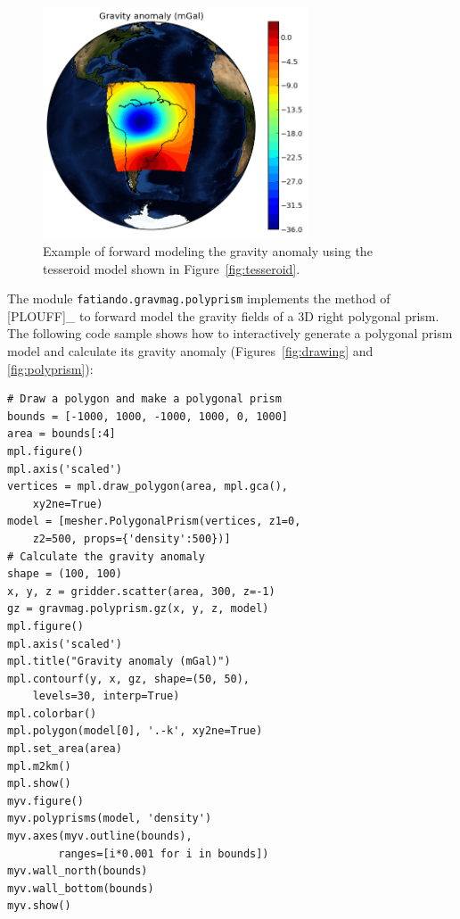 \begin{figure}
    \centering
    \includegraphics[width=0.7\textwidth]{figures/paper1/gravmag_tesseroid_data}
    \caption{
        Example of forward modeling the gravity anomaly using the tesseroid
        model shown in Figure~\ref{fig:tesseroid}.
    }
    \label{fig:tesseroidgrav}
\end{figure}

The module \texttt{fatiando.gravmag.polyprism} implements the method of
{[}PLOUFF{]}\_ to forward model the gravity fields of a 3D right
polygonal prism. The following code sample shows how to interactively
generate a polygonal prism model and calculate its gravity anomaly
(Figures~\ref{fig:drawing} and \ref{fig:polyprism}):

\begin{verbatim}
# Draw a polygon and make a polygonal prism
bounds = [-1000, 1000, -1000, 1000, 0, 1000]
area = bounds[:4]
mpl.figure()
mpl.axis('scaled')
vertices = mpl.draw_polygon(area, mpl.gca(),
    xy2ne=True)
model = [mesher.PolygonalPrism(vertices, z1=0,
    z2=500, props={'density':500})]
# Calculate the gravity anomaly
shape = (100, 100)
x, y, z = gridder.scatter(area, 300, z=-1)
gz = gravmag.polyprism.gz(x, y, z, model)
mpl.figure()
mpl.axis('scaled')
mpl.title("Gravity anomaly (mGal)")
mpl.contourf(y, x, gz, shape=(50, 50),
    levels=30, interp=True)
mpl.colorbar()
mpl.polygon(model[0], '.-k', xy2ne=True)
mpl.set_area(area)
mpl.m2km()
mpl.show()
myv.figure()
myv.polyprisms(model, 'density')
myv.axes(myv.outline(bounds),
        ranges=[i*0.001 for i in bounds])
myv.wall_north(bounds)
myv.wall_bottom(bounds)
myv.show()
\end{verbatim}

